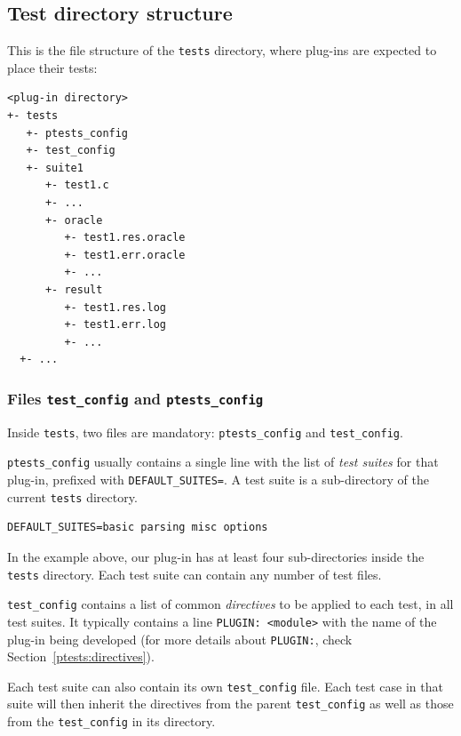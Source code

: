 \subsection{Test directory structure}\label{ptests:structure}

This is the file structure of the \verb|tests| directory, where \framac
plug-ins are expected to place their tests:

\begin{lstlisting}[language={}]
<plug-in directory>
+- tests
   +- ptests_config
   +- test_config
   +- suite1
      +- test1.c
      +- ...
      +- oracle
         +- test1.res.oracle
         +- test1.err.oracle
         +- ...
      +- result
         +- test1.res.log
         +- test1.err.log
         +- ...
  +- ...
\end{lstlisting}

\subsubsection{Files \texttt{test\_config} and \texttt{ptests\_config}}

Inside \verb|tests|, two files are mandatory:
\verb|ptests_config| and \verb|test_config|.

\verb|ptests_config| usually contains a single line
with the list of {\em test suites} for that plug-in, prefixed with
\verb|DEFAULT_SUITES=|.
A test suite is a sub-directory of the current \texttt{tests}
directory.

\begin{lstlisting}
DEFAULT_SUITES=basic parsing misc options
\end{lstlisting}

In the example above, our plug-in has at least four sub-directories inside the
\verb|tests| directory. Each test suite can contain any number of test files.

\verb|test_config| contains a list of
common {\em directives} to be applied to each test, in all test suites.
It typically contains a line \verb|PLUGIN: <module>| with the name of the
plug-in being developed (for more details about \verb|PLUGIN:|, check
Section~\ref{ptests:directives}).

Each test suite can also contain its own \verb|test_config| file. Each test
case in that suite will then inherit the directives from the parent
\verb|test_config| as well as those from the \verb|test_config| in its
directory.

